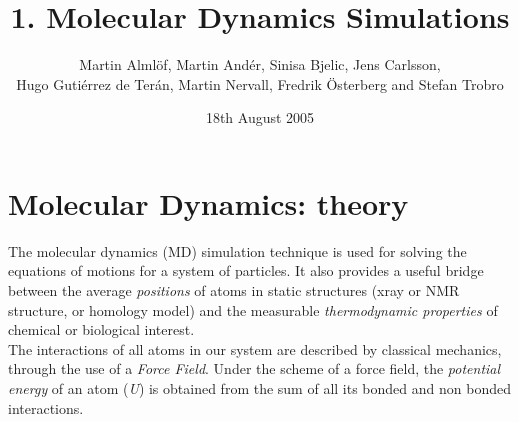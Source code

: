 \documentclass[a4paper,12pt]{article}
\title{1. Molecular Dynamics Simulations}
\author{Martin Alml\"{o}f, Martin And\'er, Sinisa Bjelic, Jens Carlsson, \\ Hugo Guti\'errez de Ter\'an, Martin Nervall, Fredrik \"{O}sterberg and Stefan Trobro}
\date{18th August 2005}
\newcommand{\sctn}[1]{\section{\large #1}}
\begin{document}
\maketitle

\tableofcontents

\newpage
%
%


\sctn{Molecular Dynamics: theory}



The molecular dynamics (MD) simulation technique is used for solving the equations of motions for a system of particles. It also provides a useful bridge between the average {\it positions} of atoms in static  structures (xray or NMR structure, or homology model) and the measurable {\it thermodynamic properties} of chemical or biological interest.\\
The interactions of all atoms in our system are described by
classical mechanics, through the use of a {\it Force Field}. Under
the scheme of a force field, the {\it potential energy} of an atom
({\it U}) is obtained from the sum of all its bonded and non
bonded interactions. \newline
\end{document}
